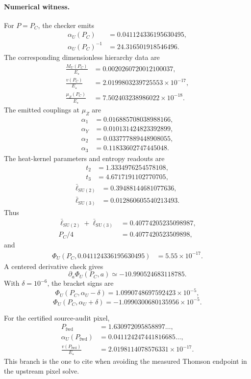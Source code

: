 \paragraph{Numerical witness.}
For \(P=P_C\), the checker emits
\[
\begin{aligned}
\alpha_U(P_C)&=0.041124336195630495,\\
\alpha_U(P_C)^{-1}&=24.316501918546496.
\end{aligned}
\]
The corresponding dimensionless hierarchy data are
\[
\begin{aligned}
\frac{M_U(P_C)}{E_\star}&=0.0020260720012100037,\\
\frac{v(P_C)}{E_\star}&=2.0199803239725553\times10^{-17},\\
\frac{\mu_Z(P_C)}{E_\star}&=7.502403238986022\times10^{-18}.
\end{aligned}
\]
The emitted couplings at \(\mu_Z\) are
\[
\begin{aligned}
\alpha_1&=0.016885708038988166,\\
\alpha_Y&=0.010131424823392899,\\
\alpha_2&=0.033777889448908055,\\
\alpha_3&=0.11833602747445048.
\end{aligned}
\]
The heat-kernel parameters and entropy readouts are
\[
\begin{aligned}
t_2&=1.3334976254578108,\\
t_3&=4.6717191102770705,
\end{aligned}
\]
\[
\begin{aligned}
\bar\ell_{\mathrm{SU}(2)}&=0.39488144681077636,\\
\bar\ell_{\mathrm{SU}(3)}&=0.012860605540213493.
\end{aligned}
\]
Thus
\[
\begin{aligned}
\bar\ell_{\mathrm{SU}(2)}+\bar\ell_{\mathrm{SU}(3)}
&=0.40774205235098987,\\
P_C/4&=0.4077420523509898,
\end{aligned}
\]
and
\[
\begin{aligned}
\Phi_U(P_C,0.041124336195630495)
&=5.55\times10^{-17}.
\end{aligned}
\]
A centered derivative check gives
\[
\partial_a\Phi_U(P_C,a)\simeq -10.990524683118785.
\]
With \(\delta=10^{-6}\), the bracket signs are
\[
\Phi_U(P_C,\alpha_U-\delta)=1.0990748697592423\times10^{-5},
\]
\[
\Phi_U(P_C,\alpha_U+\delta)=-1.0990300680135956\times10^{-5}.
\]

For the certified source-audit pixel,
\[
\begin{aligned}
P_{\mathrm{fwd}}&=1.630972095858897\ldots,\\
\alpha_U(P_{\mathrm{fwd}})&=0.041124247441816685\ldots,\\
\frac{v(P_{\mathrm{fwd}})}{E_\star}&=2.0198114078576331\times10^{-17}.
\end{aligned}
\]
This branch is the one to cite when avoiding the measured Thomson endpoint in the upstream pixel
solve.

